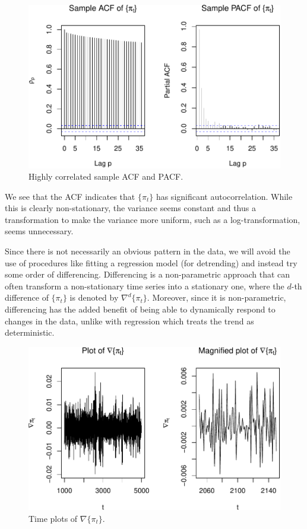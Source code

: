 \documentclass[final,
  11pt,
]{article}
\begin{document}
\begin{figure}
\includegraphics{paper_files/figure-latex/unnamed-chunk-3-1.pdf}
\caption{Highly correlated sample ACF and PACF.}
\label{fig:f0}
\end{figure}

We see that the ACF indicates that \(\{\pi_t\}\) has significant
autocorrelation. While this is clearly non-stationary, the variance
seems constant and thus a transformation to make the variance more
uniform, such as a log-transformation, seems unnecessary.

Since there is not necessarily an obvious pattern in the data, we will
avoid the use of procedures like fitting a regression model (for
detrending) and instead try some order of differencing. Differencing is
a non-parametric approach that can often transform a non-stationary time
series into a stationary one, where the \(d\)-th difference of
\(\{\pi_t\}\) is denoted by \(\nabla^d\{\pi_t\}\). Moreover, since it is
non-parametric, differencing has the added benefit of being able to
dynamically respond to changes in the data, unlike with regression which
treats the trend as deterministic.

\begin{figure}
\includegraphics{paper_files/figure-latex/unnamed-chunk-4-1.pdf}
\caption{Time plots of $\nabla \{\pi_t\}$.}
\label{fig:f1}
\end{figure}
\end{document}

